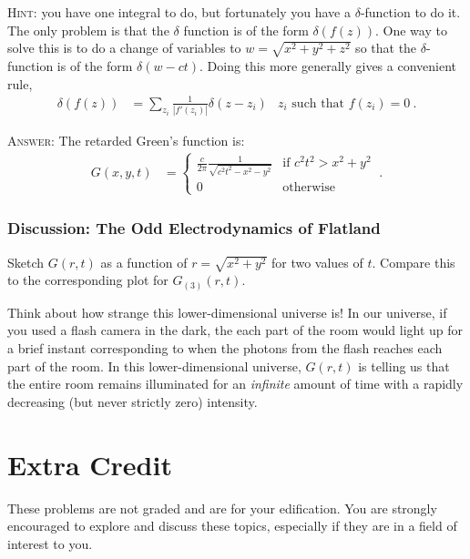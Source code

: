 \documentclass[12pt]{article}
\numberwithin{equation}{subsection}    %
\begin{document}
\textsc{Hint:} you have one integral to do, but fortunately you have a $\delta$-function to do it. The only problem is that the $\delta$ function is of the form $\delta\left(f(z)\right)$. One way to solve this is to do a change of variables to $w = \sqrt{x^2+y^2+z^2}$ so that the $\delta$-function is of the form $\delta(w-ct)$. Doing this more generally gives a convenient rule,
\begin{align}
	\delta\left(f(z)\right) &= \sum_{z_i} \frac{1}{|f'(z_i)|} \delta(z-z_i)
	&
	z_i \text{ such that } f(z_i) = 0 \ .
\end{align}

\textsc{Answer:} The retarded Green's function is:
\begin{align}
	G(x,y,t)  &= 
	\left\{
	\begin{array}{ll}
		\frac{c}{2\pi} \frac{1}{\sqrt{c^2 t^2 - x^2 - y^2}}
		& \text{if } c^2t^2 > x^2 + y^2\\
		0 & \text{otherwise}
	\end{array}
	\right. \ .
\end{align}


\subsubsection{Discussion: The Odd Electrodynamics of Flatland}

Sketch $G(r,t)$ as a function of $r = \sqrt{x^2 + y^2}$ for two values of $t$. Compare this to the corresponding plot for $G_{(3)}(r,t)$. 

Think about how strange this lower-dimensional universe is! In our universe, if you used a flash camera in the dark, the each part of the room would light up for a brief instant corresponding to when the photons from the flash reaches each part of the room. In this lower-dimensional universe, $G(r,t)$ is telling us that the entire room remains illuminated for an \emph{infinite} amount of time with a rapidly decreasing (but never strictly zero) intensity.







\section*{Extra Credit}

These problems are not graded and are for your edification. You are strongly encouraged to explore and discuss these topics, especially if they are in a field of interest to you.
\end{document}
